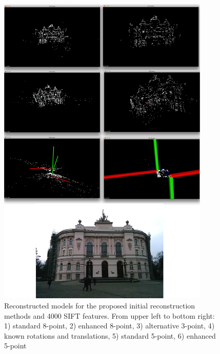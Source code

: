 \begin{figure}[p]
    \centering
    \includegraphics[width=0.9\textwidth]{uni4000Comparison}
    \caption{Reconstructed models for the proposed initial reconstruction methods and 4000 SIFT features. From upper left to bottom right: 1) standard 8-point, 2) enhanced 8-point, 3) alternative 3-point, 4) known rotations and translations, 5) standard 5-point, 6) enhanced 5-point}
    \label{fig:uni4000Comparison}
\end{figure}
